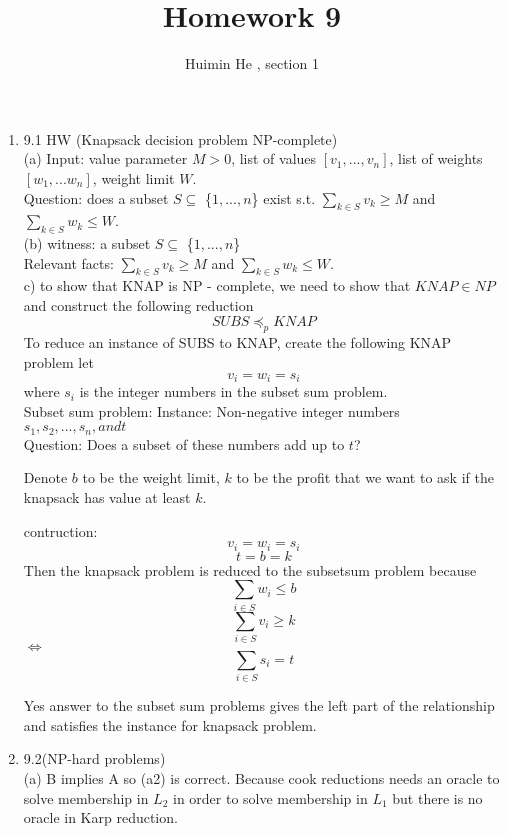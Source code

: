 \documentclass[11pt]{article}
\title{Homework 9}
\author{Huimin He , section 1}
\begin{document}
\maketitle


\def\bfor{\textbf{for}}
\def\bdo{\textbf{do}}
\def\bwhile{\textbf{while}}
\def\bend{\textbf{end}}
\def\bif{\textbf{if}}
\def\bthen{\textbf{then}}
\def\belse{\textbf{else}}
\def\breturn{\textbf{return}}
\def\bexit{\textbf{exit}}
\def\bprint{\textbf{print}}


\begin{enumerate}

\item 9.1 HW (Knapsack decision problem NP-complete)\\
(a) Input: value parameter $M>0$, list of values $[v_1,...,v_n]$, list of weights $[w_1,...w_n]$, weight limit $W$. \\
Question: does a subset $ S \subseteq$ \{$1,...,n$\} exist s.t.
$ \sum\limits_{k \in S} v_k \geq M$ and 
$ \sum\limits_{k \in S} w_k \leq W$. \\

(b) witness: a subset $ S \subseteq$ \{$1,...,n$\} \\
Relevant facts:
$ \sum\limits_{k \in S} v_k \geq M$ and 
$ \sum\limits_{k \in S} w_k \leq W$. \\

c) to show that KNAP is NP - complete, we need to show that $KNAP \in NP$ and  construct the following reduction
\[ SUBS \preccurlyeq_p KNAP\] 
To reduce an instance of SUBS to KNAP, create the following KNAP problem let \[v_i = w_i = s_i\] where $s_i$ is the integer numbers in the subset sum problem.\\
 Subset sum problem:
 Instance: Non-negative integer numbers $s_1, s_2 , ... ,s_n, and t$\\
 Question: Does a subset of these numbers add up to $t$?

Denote $b$ to be the weight limit, $k$ to be the profit that we want to ask if the knapsack has value at least $k$.

contruction:\\
\[v_i = w_i = s_i\]
\[ t=b=k\]
Then the knapsack problem is reduced to the subsetsum problem because
\[ \sum_{i \in S} w_i \leq b\]
\[ \sum_{i \in S} v_i \geq k\]
$\iff$ 
\[ \sum_{i \in S} s_i = t\]

Yes answer to the subset sum problems gives the left part of the relationship and satisfies the instance for knapsack problem.


\item 9.2(NP-hard problems)\\
(a) B implies A so (a2) is correct. Because cook reductions needs an oracle
to solve membership in $L_2$ in order to solve membership in $L_1$ but there is no oracle in Karp reduction. 


\end{enumerate}
\end{document}
